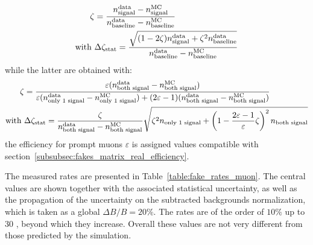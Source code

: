 \begin{align}
\zeta&=\frac{n_\text{signal}^\text{data} - n_\text{signal}^\text{MC}}{n_\text{baseline}^\text{data} - n_\text{baseline}^\text{MC}}\\
\text{with }&\Delta\zeta_\text{stat} = \frac{\sqrt{(1-2\zeta)n_\text{signal}^\text{data} + \zeta^2 n_\text{baseline}^\text{data}}}
{n_\text{baseline}^\text{data} - n_\text{baseline}^\text{MC}}\notag
\end{align}
while the latter are obtained with:
\begin{align}
\zeta &= \frac{\varepsilon (n_\text{both signal}^\text{data} - n_\text{both signal}^\text{MC})}
{\varepsilon (n_\text{only 1 signal}^\text{data} - n_\text{only 1 signal}^\text{MC})
+(2\varepsilon-1)(n_\text{both signal}^\text{data} - n_\text{both signal}^\text{MC})}\\
\text{with }&\Delta\zeta_\text{stat} 
= \frac{\zeta}{n_\text{both signal}^\text{data} - n_\text{both signal}^\text{MC}}
\sqrt{\zeta^2 n_\text{only 1 signal} + \left(1-\frac{2\varepsilon-1}{\varepsilon}\zeta\right)^2 n_\text{both signal}}\notag
\end{align}
the efficiency for prompt muons $\varepsilon$ is assigned values compatible with section~\ref{subsubsec:fakes_matrix_real_efficiency}. 

The measured rates are presented in Table~\ref{table:fake_rates_muon}. 
The central values are shown together with the associated statistical uncertainty, 
as well as the propagation of the uncertainty on the subtracted backgrounds normalization, 
which is taken as a global $\Delta B/B=20\%$. 
The rates are of the order of $10\%$ up to 30 \GeV, beyond which they increase. 
Overall these values are not very different from those predicted by the simulation. 

